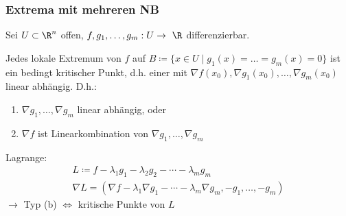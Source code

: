\subsubsection{Extrema mit mehreren NB}
Sei $U \subset \R^n$ offen, $f , g_1 , \dotsc , g_m : U \rightarrow \R$ differenzierbar.
\begin{fakt}
	Jedes lokale Extremum von $f$ auf $B \coloneqq \{ x \in U \mid g_1(x) = \dots = g_m(x) = 0 \}$ ist ein bedingt kritischer Punkt, d.h. einer mit $\nabla f(x_0) , \nabla g_1(x_0) , \dotsc , \nabla g_m(x_0)$ linear abhängig. D.h.:
	\begin{enumerate}[label = (\alph*)]
		\item $\nabla g_1 , \dotsc , \nabla g_m$ linear abhängig, oder
		\item $\nabla f$ ist Linearkombination von $\nabla g_1 , \dotsc , \nabla g_m$
	\end{enumerate}
\end{fakt}
Lagrange:
\begin{gather*}
	L \coloneqq f - \lambda_1 g_1 - \lambda_2 g_2 - \dotsb - \lambda_m g_m \\
	\nabla L = ( \nabla f - \lambda_1 \nabla g_1 - \dotsb - \lambda_m \nabla g_m , -g_1 , \dotsc , -g_m )
\end{gather*}
$\rightarrow$ Typ (b) $\iff$ kritische Punkte von $L$
